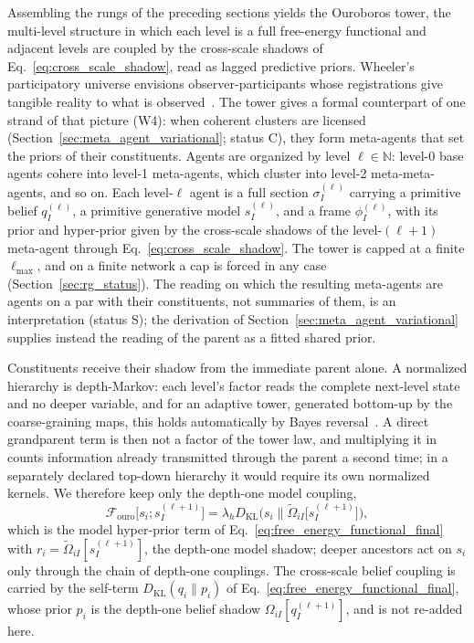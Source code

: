 Assembling the rungs of the preceding sections yields the Ouroboros tower, the multi-level structure in which each level is a full free-energy functional and adjacent levels are coupled by the cross-scale shadows of Eq.~\eqref{eq:cross_scale_shadow}, read as lagged predictive priors. Wheeler's participatory universe envisions observer-participants whose registrations give tangible reality to what is observed~\cite{Wheeler1983, Wheeler1990}. The tower gives a formal counterpart of one strand of that picture (W4): when coherent clusters are licensed (Section~\ref{sec:meta_agent_variational}; status C), they form meta-agents that set the priors of their constituents. Agents are organized by level $\ell \in \mathbb{N}$: level-0 base agents cohere into level-1 meta-agents, which cluster into level-2 meta-meta-agents, and so on. Each level-$\ell$ agent is a full section $\sigma_I^{(\ell)}$ carrying a primitive belief $q_I^{(\ell)}$, a primitive generative model $s_I^{(\ell)}$, and a frame $\phi_I^{(\ell)}$, with its prior and hyper-prior given by the cross-scale shadows of the level-$(\ell+1)$ meta-agent through Eq.~\eqref{eq:cross_scale_shadow}. The tower is capped at a finite $\ell_{\max}$, and on a finite network a cap is forced in any case (Section~\ref{sec:rg_status}). The reading on which the resulting meta-agents are agents on a par with their constituents, not summaries of them, is an interpretation (status S); the derivation of Section~\ref{sec:meta_agent_variational} supplies instead the reading of the parent as a fitted shared prior.

Constituents receive their shadow from the immediate parent alone. A normalized hierarchy is depth-Markov: each level's factor reads the complete next-level state and no deeper variable, and for an adaptive tower, generated bottom-up by the coarse-graining maps, this holds automatically by Bayes reversal~\cite[Ch.~12]{DennisGaugeVFE2026}. A direct grandparent term is then not a factor of the tower law, and multiplying it in counts information already transmitted through the parent a second time; in a separately declared top-down hierarchy it would require its own normalized kernels. We therefore keep only the depth-one model coupling,
\begin{equation}
\mathcal{F}_{\mathrm{ouro}}\big[s_i; s_I^{(\ell+1)}\big] = \lambda_h D_{\mathrm{KL}}\big(s_i \big\| \tilde\Omega_{iI}\big[s_I^{(\ell+1)}\big]\big),
\label{eq:ouroboros_F}
\end{equation}
which is the model hyper-prior term of Eq.~\eqref{eq:free_energy_functional_final} with $r_i = \tilde\Omega_{iI}[s_I^{(\ell+1)}]$, the depth-one model shadow; deeper ancestors act on $s_i$ only through the chain of depth-one couplings. The cross-scale belief coupling is carried by the self-term $D_{\mathrm{KL}}(q_i \| p_i)$ of Eq.~\eqref{eq:free_energy_functional_final}, whose prior $p_i$ is the depth-one belief shadow $\Omega_{iI}[q_I^{(\ell+1)}]$, and is not re-added here.

